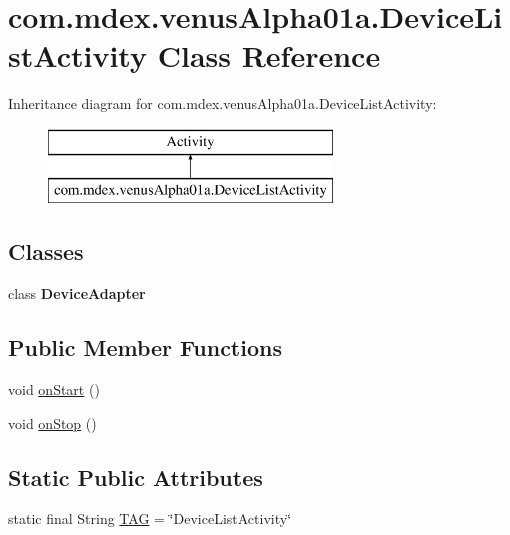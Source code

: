 \hypertarget{classcom_1_1mdex_1_1venus_alpha01a_1_1_device_list_activity}{}\section{com.\+mdex.\+venus\+Alpha01a.\+Device\+List\+Activity Class Reference}
\label{classcom_1_1mdex_1_1venus_alpha01a_1_1_device_list_activity}
Inheritance diagram for com.\+mdex.\+venus\+Alpha01a.\+Device\+List\+Activity\+:\begin{figure}[H]
\begin{center}
\leavevmode
\includegraphics[height=2.000000cm]{classcom_1_1mdex_1_1venus_alpha01a_1_1_device_list_activity}
\end{center}
\end{figure}
\subsection*{Classes}
\begin{DoxyCompactItemize}
\item 
class {\bfseries Device\+Adapter}
\end{DoxyCompactItemize}
\subsection*{Public Member Functions}
\begin{DoxyCompactItemize}
\item 
void \hyperlink{classcom_1_1mdex_1_1venus_alpha01a_1_1_device_list_activity_a327ae65efd7866bcfd58748d9ee1b359}{on\+Start} ()
\item 
void \hyperlink{classcom_1_1mdex_1_1venus_alpha01a_1_1_device_list_activity_a9d59af99f3f42b06de3a9f6b69ed578d}{on\+Stop} ()
\end{DoxyCompactItemize}
\subsection*{Static Public Attributes}
\begin{DoxyCompactItemize}
\item 
static final String \hyperlink{classcom_1_1mdex_1_1venus_alpha01a_1_1_device_list_activity_aa516a857488139196c6b5379a1b49884}{T\+AG} = \char`\"{}Device\+List\+Activity\char`\"{}
\end{DoxyCompactItemize}
